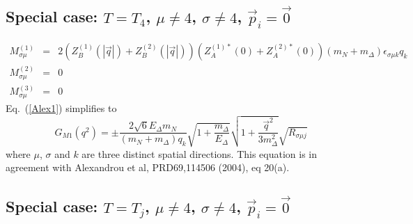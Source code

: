 \documentclass[12pt]{article}
\begin{document}
\subsection{Special case: $T=T_4$, $\mu\neq4$, $\sigma\neq4$, $\vec p_i=\vec 0$}

\begin{eqnarray}
M_{\sigma\mu}^{(1)}
 &=& 2\left(Z_B^{(1)}(|\vec q|)+Z_B^{(2)}(|\vec q|)\right)
     \left(Z_A^{(1)*}(0)+Z_A^{(2)*}(0)\right)
     (m_N+m_\Delta)\epsilon_{\sigma\mu k}q_k \nonumber \\
M_{\sigma\mu}^{(2)} &=& 0 \nonumber \\
M_{\sigma\mu}^{(3)} &=& 0 \nonumber
\end{eqnarray}
Eq.~(\ref{Alex1}) simplifies to
\[
G_{M1}(q^2) = \pm\frac{2\sqrt{6}E_\Delta m_N}{(m_N+m_\Delta)q_k}
              \sqrt{1+\frac{m_\Delta}{E_\Delta}}
              \sqrt{1+\frac{\vec q^2}{3m_\Delta^2}}
              \sqrt{R_{\sigma\mu j}}
\]
where $\mu$, $\sigma$ and $k$ are three distinct spatial directions.
This equation is in agreement with Alexandrou et al, PRD69,114506 (2004), eq 20(a).

\subsection{Special case: $T=T_j$, $\mu\neq4$, $\sigma\neq4$, $\vec p_i=\vec 0$}
\end{document}
